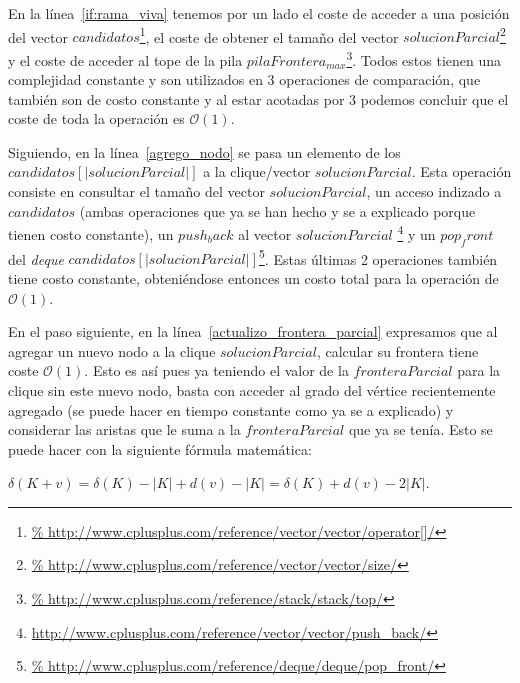 \par En la l\'inea~\ref{if:rama_viva} tenemos por un lado el coste de acceder
    a una posici\'on del vector $candidatos$\footnote{\url{%
    http://www.cplusplus.com/reference/vector/vector/operator[]/}}, el coste
    de obtener el tama\~no del vector $solucionParcial$\footnote{\url{%
    http://www.cplusplus.com/reference/vector/vector/size/}} y el coste
    de acceder al tope de la pila $pilaFrontera_{max}$\footnote{\url{%
    http://www.cplusplus.com/reference/stack/stack/top/}}. Todos estos
    tienen una complejidad constante y son utilizados en 3 operaciones de comparaci\'on,
    que tambi\'en son de costo constante y al estar acotadas por 3 podemos concluir
    que el coste de toda la operaci\'on es $\mathcal O(1)$.

\par Siguiendo, en la l\'inea~\ref{agrego_nodo} se pasa un elemento de los $candidatos[|solucionParcial|]$
    a la clique/vector $solucionParcial$. Esta operaci\'on consiste
    en consultar el tama\~no del vector $solucionParcial$, un acceso
    indizado a $candidatos$ (ambas operaciones que ya se han hecho y se a explicado
    porque tienen costo constante), un $push_back$ al vector $solucionParcial$
    \footnote{\url{http://www.cplusplus.com/reference/vector/vector/push_back/}} y
    un $pop_front$ del \emph{deque} $candidatos[|solucionParcial|]$\footnote{\url{%
    http://www.cplusplus.com/reference/deque/deque/pop_front/}}. Estas \'ultimas
    2 operaciones tambi\'en tiene costo constante, obteni\'endose entonces
    un costo total para la operaci\'on de $\mathcal O(1)$.

\par En el paso siguiente, en la l\'inea~\ref{actualizo_frontera_parcial}
    expresamos que al agregar un nuevo nodo a la clique $solucionParcial$,
    calcular su frontera tiene coste $\mathcal O(1)$. Esto es as\'i pues
    ya teniendo el valor de la $fronteraParcial$ para la clique sin este
    nuevo nodo, basta con acceder al grado del v\'ertice recientemente
    agregado (se puede hacer en tiempo constante como ya se a explicado)
    y considerar las aristas que le suma a la $fronteraParcial$ que ya
    se ten\'ia. Esto se puede hacer con la siguiente f\'ormula matem\'atica:

\bigskip

\par $\delta(K+v) = \delta(K) - |K| + d(v) - |K| = \delta(K) + d(v) - 2|K|$.

\bigskip

